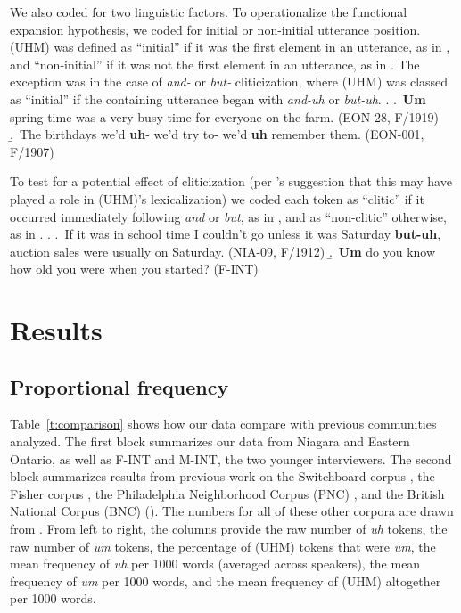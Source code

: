 \documentclass[11pt]{article}
\begin{document}
We also coded for two linguistic factors.
To operationalize the functional expansion hypothesis, we coded for initial or
non-initial utterance position.
(UHM) was defined as ``initial'' if it was the first element in an utterance,
as in \Next[a], and ``non-initial'' if it was not the first element in an
utterance, as in \Next[b].
The exception was in the case of \emph{and-} or \emph{but-} cliticization, where
(UHM) was classed as ``initial'' if the containing utterance began with
\emph{and-uh} or \emph{but-uh}.
\ex.
\a.~\textbf{Um} spring time was a very busy time for everyone on the farm.
(EON-28, F/1919)
\b.~The birthdays we'd \textbf{uh}- we'd try to- we'd \textbf{uh} remember them.
(EON-001, F/1907)


To test for a potential effect of cliticization (per \citeauthor{tottie2017}'s
\citeyear{tottie2017} suggestion that this may have played a role in (UHM)'s
lexicalization) we coded each token as ``clitic'' if it occurred immediately
following \emph{and} or \emph{but}, as in \Next[a], and as ``non-clitic''
otherwise, as in \Next[b].
\ex.
\a.~If it was in school time I couldn't go unless it was Saturday
\textbf{but-uh}, auction sales were usually on Saturday. \hfill (NIA-09, F/1912)
\b.~\textbf{Um} do you know how old you were when you started? \hfill (F-INT)

\section{Results}

\subsection{Proportional frequency}

Table~\ref{t:comparison} shows how our data compare with previous communities
analyzed.
The first block summarizes our data from Niagara and Eastern Ontario, as well as
F-INT and M-INT, the two younger interviewers.
The second block summarizes results from previous work on the Switchboard corpus
\parencite{switchboard}, the Fisher corpus \parencite{fisher}, the Philadelphia
Neighborhood Corpus (PNC) \parencite{labovrosenfelder2011}, and the British
National Corpus (BNC) (\citeyear{bnc}).
The numbers for all of these other corpora are drawn from
\textcite{wielingetal2016}.
From left to right, the columns provide the raw number of \emph{uh} tokens, the
raw number of \emph{um} tokens, the percentage of (UHM) tokens that were
\emph{um}, the mean frequency of \emph{uh} per 1000 words (averaged across
speakers), the mean frequency of \emph{um} per 1000 words, and the mean
frequency of (UHM) altogether per 1000 words.
\end{document}
